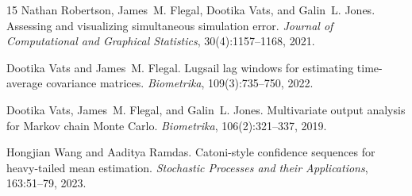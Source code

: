 \documentclass[11pt]{article}
\begin{document}
\begin{thebibliography}{15}
Nathan Robertson, James~M. Flegal, Dootika Vats, and Galin~L. Jones.
\newblock Assessing and visualizing simultaneous simulation error.
\newblock \emph{Journal of Computational and Graphical Statistics}, 30(4):1157--1168, 2021.

Dootika Vats and James~M. Flegal.
\newblock Lugsail lag windows for estimating time-average covariance matrices.
\newblock \emph{Biometrika}, 109(3):735--750, 2022.

Dootika Vats, James~M. Flegal, and Galin~L. Jones.
\newblock Multivariate output analysis for {M}arkov chain {M}onte {C}arlo.
\newblock \emph{Biometrika}, 106(2):321--337, 2019.

Hongjian Wang and Aaditya Ramdas.
\newblock Catoni-style confidence sequences for heavy-tailed mean estimation.
\newblock \emph{Stochastic Processes and their Applications}, 163:51--79, 2023.

\end{thebibliography}
\end{document}
